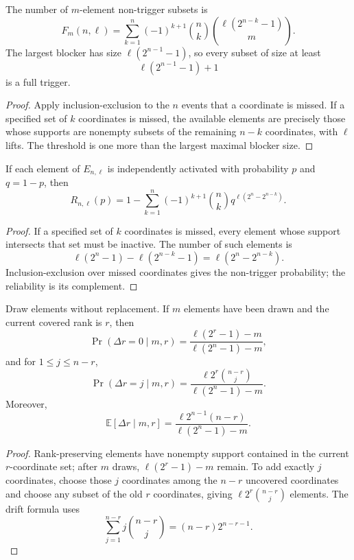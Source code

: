 \begin{theorem}
\label{thm:philosophy-universal-blocker-counts}
The number of $m$-element non-trigger subsets is
$$
  F_{m}(n,\ell)
  =
  \sum_{k=1}^{n}
  (-1)^{k+1}
  \binom{n}{k}
  \binom{\ell(2^{n-k}-1)}{m}.
$$
The largest blocker has size $\ell(2^{n-1}-1)$, so every subset of
size at least
$$
  \ell(2^{n-1}-1)+1
$$
is a full trigger.
\end{theorem}
\begin{proof}
Apply inclusion-exclusion to the $n$ events that a coordinate is
missed. If a specified set of $k$ coordinates is missed, the available
elements are precisely those whose supports are nonempty subsets of
the remaining $n-k$ coordinates, with $\ell$ lifts. The threshold is
one more than the largest maximal blocker size.
\end{proof}

\begin{theorem}
\label{thm:philosophy-universal-bernoulli-reliability}
If each element of $E_{n,\ell}$ is independently activated with
probability $p$ and $q=1-p$, then
$$
  R_{n,\ell}(p)
  =
  1-
  \sum_{k=1}^{n}
  (-1)^{k+1}
  \binom{n}{k}
  q^{\ell(2^{n}-2^{n-k})}.
$$
\end{theorem}
\begin{proof}
If a specified set of $k$ coordinates is missed, every element whose
support intersects that set must be inactive. The number of such
elements is
$$
  \ell(2^{n}-1)-\ell(2^{n-k}-1)=\ell(2^{n}-2^{n-k}).
$$
Inclusion-exclusion over missed coordinates gives the non-trigger
probability; the reliability is its complement.
\end{proof}

\begin{theorem}
\label{thm:philosophy-universal-markov-rank-transition}
Draw elements without replacement. If $m$ elements have been drawn and
the current covered rank is $r$, then
$$
  \Pr(\Delta r=0\mid m,r)
  =
  \frac{\ell(2^{r}-1)-m}{\ell(2^{n}-1)-m},
$$
and for $1\leq j\leq n-r$,
$$
  \Pr(\Delta r=j\mid m,r)
  =
  \frac{\ell 2^{r}\binom{n-r}{j}}
  {\ell(2^{n}-1)-m}.
$$
Moreover,
$$
  \mathbb{E}[\Delta r\mid m,r]
  =
  \frac{\ell 2^{n-1}(n-r)}
  {\ell(2^{n}-1)-m}.
$$
\end{theorem}
\begin{proof}
Rank-preserving elements have nonempty support contained in the current
$r$-coordinate set; after $m$ draws, $\ell(2^{r}-1)-m$ remain. To add
exactly $j$ coordinates, choose those $j$ coordinates among the
$n-r$ uncovered coordinates and choose any subset of the old $r$
coordinates, giving $\ell 2^{r}\binom{n-r}{j}$ elements. The drift
formula uses
$$
  \sum_{j=1}^{n-r}j\binom{n-r}{j}=(n-r)2^{n-r-1}.
$$
\end{proof}

